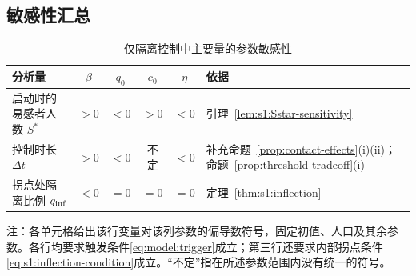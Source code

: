 \subsection{敏感性汇总}
\begin{table}[H]
\centering\small
\setlength{\tabcolsep}{3.5pt}
\renewcommand{\arraystretch}{1.25}
\begin{threeparttable}
\caption{仅隔离控制中主要量的参数敏感性}
\label{tab:sensitivity}\label{tab:s1:lambda-sensitivity}\label{tab:s1:inflection-roles}
\begin{tabularx}{\linewidth}{@{}Xccccp{.24\linewidth}@{}}
\toprule
分析量 & $\beta$ & $q_0$ & $c_0$ & $\eta$ & 依据\\
\midrule
启动时的易感者人数 $S^*$ & $>0$ & $<0$ & $>0$ & $<0$ & 引理~\ref{lem:s1:Sstar-sensitivity}\\
控制时长 $\Delta t$ & $>0$ & $<0$ & 不定 & $<0$ & 补充命题~\ref{prop:contact-effects}(i)(ii)；命题~\ref{prop:threshold-tradeoff}(i)\\
拐点处隔离比例 $q_{\mathrm{inf}}$ & $<0$ & $=0$ & $=0$ & $=0$ & 定理~\ref{thm:s1:inflection}\\
\bottomrule
\end{tabularx}
\begin{tablenotes}[flushleft]\footnotesize
\item 注：各单元格给出该行变量对该列参数的偏导数符号，固定初值、人口及其余参数。各行均要求触发条件\eqref{eq:model:trigger}成立；第三行还要求内部拐点条件\eqref{eq:s1:inflection-condition}成立。“不定”指在所述参数范围内没有统一的符号。
\end{tablenotes}
\end{threeparttable}
\end{table}
